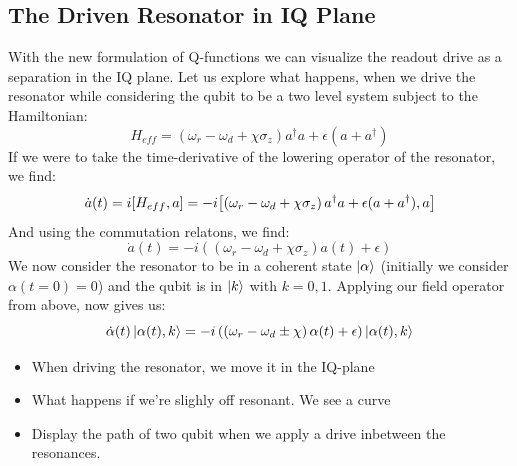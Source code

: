 \subsection{The Driven Resonator in IQ Plane}\label{sec:driving_resonator_iq_plane}
With the new formulation of Q-functions we can visualize the readout drive as a separation in the IQ plane. Let us explore what happens, when we drive the resonator while considering the qubit to be a two level system subject to the Hamiltonian:
\begin{equation}
    H_{eff} =  \left(\omega_r - \omega_d + \chi \sigma_z\right)a^\dagger a + \epsilon(a + a^\dagger)
\end{equation}
If we were to take the time-derivative of the lowering operator of the resonator, we find:
\begin{equation}
    \dot{a}(t) = i\comm{H_{eff}}{a} = -i\comm{\left(\omega_r - \omega_d + \chi \sigma_z\right)a^\dagger a + \epsilon(a + a^\dagger)}{a}
\end{equation}
And using the commutation relatons, we find:
\begin{equation}
    \dot{a}(t) = -i \left(\left(\omega_r - \omega_d + \chi \sigma_z\right) a(t) + \epsilon\right)
\end{equation}
We now consider the resonator to be in a coherent state $\ket{\alpha}$ (initially we consider $\alpha(t=0) = 0$) and the qubit is in $\ket{k}$ with $k = 0,  1$. Applying our field operator from above, now gives us:
\begin{equation}
    \dot{\alpha}(t) \ket{\alpha(t), k} = - i \left(\left(\omega_r - \omega_d \pm \chi \right) \alpha(t) + \epsilon\right) \ket{\alpha(t), k} 
\end{equation}


\begin{itemize}
    \item When driving the resonator, we move it in the IQ-plane
    \item What happens if we're slighly off resonant. We see a curve
    \item Display the path of two qubit when we apply a drive inbetween the resonances. 
\end{itemize}


